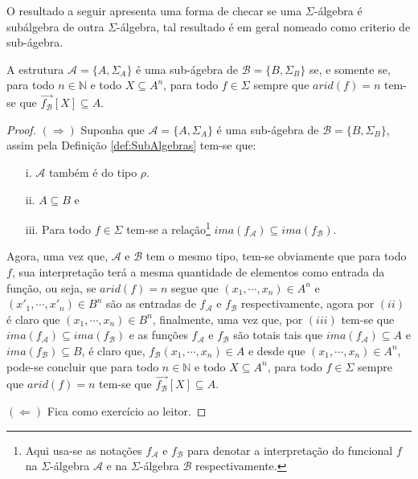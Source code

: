 O resultado a seguir apresenta uma forma de checar se uma $\Sigma$-álgebra é subálgebra de outra $\Sigma$-álgebra, tal resultado é em geral nomeado como criterio de sub-ágebra.

\begin{teorema}
  A estrutura $\mathcal{A} = \{A, \Sigma_A\}$ é uma sub-ágebra de $\mathcal{B} = \{B, \Sigma_B\}$ se, e somente se, para todo $n \in \mathbb{N}$ e todo $X \subseteq A^n$, para todo  $f \in \Sigma$ sempre que $arid(f) = n$ tem-se que $\overrightarrow{f_\mathcal{B}}[X] \subseteq A$.
\end{teorema}

\begin{proof}
  $(\Rightarrow)$ Suponha que $\mathcal{A} = \{A, \Sigma_A\}$ é uma sub-ágebra de $\mathcal{B} = \{B, \Sigma_B\}$, assim pela Definição \ref{def:SubAlgebras} tem-se que:
  \begin{itemize}
    \item[i.] $\mathcal{A}$ também é do tipo $\rho$.
    \item[ii.] $A \subseteq B$ e
    \item[iii.] Para todo $f \in \Sigma$ tem-se a relação\footnote{Aqui usa-se as notações $f_\mathcal{A}$ e $f_\mathcal{B}$ para denotar a interpretação do funcional $f$ na $\Sigma$-álgebra $\mathcal{A}$ e na $\Sigma$-álgebra $\mathcal{B}$ respectivamente.} $ima(f_\mathcal{A}) \subseteq ima(f_\mathcal{B})$.
  \end{itemize}
  Agora, uma vez que, $\mathcal{A}$ e $\mathcal{B}$ tem o mesmo tipo, tem-se obviamente que para todo $f$, sua interpretação terá a mesma quantidade de elementos como entrada da função, ou seja, se $arid(f) = n$ segue que $(x_1, \cdots, x_n) \in A^n$  e $(x'_1, \cdots, x'_n) \in B^n$ são as entradas de $f_\mathcal{A}$ e $f_\mathcal{B}$ respectivamente, agora por $(ii)$ é claro que $(x_1, \cdots, x_n) \in B^n$, finalmente, uma vez que, por $(iii)$ tem-se  que $ima(f_\mathcal{A}) \subseteq ima(f_\mathcal{B})$ e as funções $f_\mathcal{A}$ e $f_\mathcal{B}$ são totais tais que $ima(f_\mathcal{A}) \subseteq A$ e $ima(f_\mathcal{B}) \subseteq B$, é claro que, $f_\mathcal{B}(x_1, \cdots, x_n) \in A$ e desde que $(x_1, \cdots, x_n) \in A^n$, pode-se concluir que para todo $n \in \mathbb{N}$ e todo $X \subseteq A^n$, para todo  $f \in \Sigma$ sempre que $arid(f) = n$ tem-se que $\overrightarrow{f_\mathcal{B}}[X] \subseteq A$.

  $(\Leftarrow)$ Fica como exercício ao leitor.
\end{proof}


